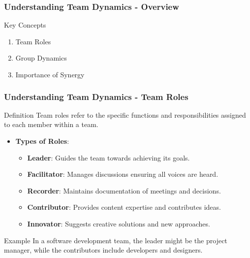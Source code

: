 \documentclass{beamer}
\begin{document}
\begin{frame}[fragile]
    \frametitle{Understanding Team Dynamics - Overview}
    \begin{block}{Key Concepts}
        \begin{enumerate}
            \item Team Roles
            \item Group Dynamics
            \item Importance of Synergy
        \end{enumerate}
    \end{block}
\end{frame}

\begin{frame}[fragile]
    \frametitle{Understanding Team Dynamics - Team Roles}
    \begin{block}{Definition}
        Team roles refer to the specific functions and responsibilities assigned to each member within a team.
    \end{block}
    \begin{itemize}
        \item \textbf{Types of Roles}:
        \begin{itemize}
            \item \textbf{Leader}: Guides the team towards achieving its goals.
            \item \textbf{Facilitator}: Manages discussions ensuring all voices are heard.
            \item \textbf{Recorder}: Maintains documentation of meetings and decisions.
            \item \textbf{Contributor}: Provides content expertise and contributes ideas.
            \item \textbf{Innovator}: Suggests creative solutions and new approaches.
        \end{itemize}
    \end{itemize}
    \begin{block}{Example}
        In a software development team, the leader might be the project manager, while the contributors include developers and designers.
    \end{block}
\end{frame}
\end{document}
